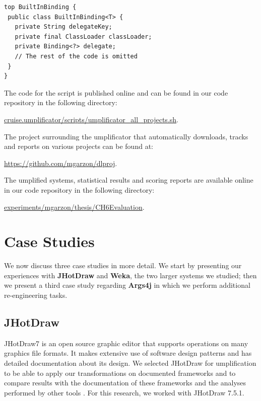 \begin{lstlisting}[style=umpleIn, caption=BuiltInBinding.ump using the Top construct, label=lst:genericUmplifiedTop]
top BuiltInBinding {
 public class BuiltInBinding<T> {
   private String delegateKey;
   private final ClassLoader classLoader;
   private Binding<?> delegate;
   // The rest of the code is omitted
 }
}
\end{lstlisting}

The code for the script is published online and can be found in our code repository \cite{umpleRepository} in the following directory:

\url{cruise.umplificator/scripts/umplificator_all_projects.sh}.

The project surrounding the umplificator that automatically downloads, tracks and reports on various projects can be found at: 

\url{https://github.com/mgarzon/dlproj}.


The umplified systems, statistical results and scoring reports are available online in our code repository \cite{umpleRepository} in the following directory:

\url{experiments/mgarzon/thesis/CH6Evaluation}.


\section{Case Studies}
\label{sec:6CaseStudies}

We now discuss three case studies in more detail. We start by presenting our experiences with \textbf{JHotDraw} and \textbf{Weka}, the two larger systems we studied; then we present a third case study regarding \textbf{Args4j} in which we perform additional re-engineering tasks.

\subsection{JHotDraw}
 
JHotDraw7 \cite{jhotdraw} is an open source graphic editor that supports operations on many graphics file formats. It makes extensive use of software design patterns and has detailed documentation about its design. We selected JHotDraw for umplification to be able to apply our transformations on documented frameworks and to compare results with the documentation of these frameworks and the analyses performed by other tools \cite{jhotdraw}. For this research, we worked with JHotDraw 7.5.1.

